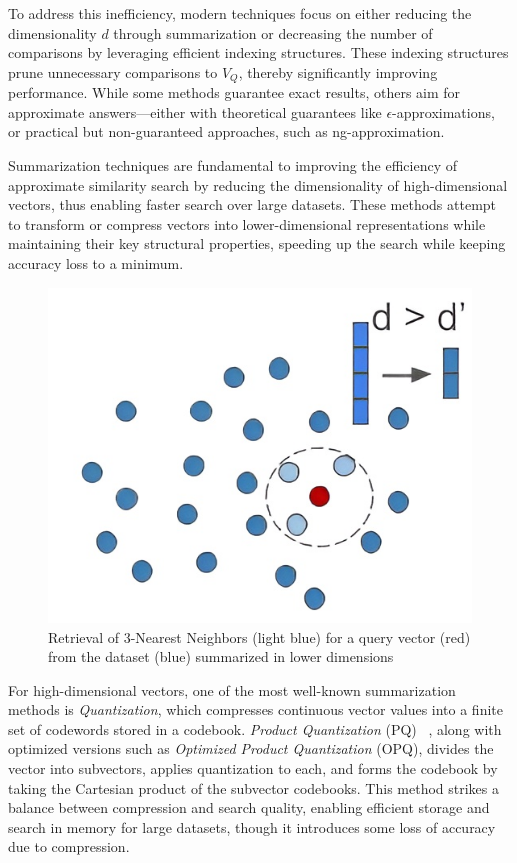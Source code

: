 To address this inefficiency, modern techniques focus on either reducing the dimensionality \(d\) through summarization or decreasing the number of comparisons by leveraging efficient indexing structures. These indexing structures prune unnecessary comparisons to \(V_Q\), thereby significantly improving performance. While some methods guarantee exact results, others aim for approximate answers—either with theoretical guarantees like \(\epsilon\)-approximations, or practical but non-guaranteed approaches, such as ng-approximation.

 Summarization techniques are fundamental to improving the efficiency of approximate similarity search by reducing the dimensionality of high-dimensional vectors, thus enabling faster search over large datasets. These methods attempt to transform or compress vectors into lower-dimensional representations while maintaining their key structural properties, speeding up the search while keeping accuracy loss to a minimum.

\begin{figure}[ht] 
\centering
		\captionsetup{justification=centering}
		\includegraphics[width=0.5\columnwidth]{../img/related/sumb.jpg}
		\caption{Retrieval of 3-Nearest Neighbors (light blue) for a query vector (red) from the dataset (blue) summarized in lower dimensions}        
		\label{fig:sum_retrieval}
\end{figure}

For high-dimensional vectors, one of the most well-known summarization methods is \textit{Quantization}, which compresses continuous vector values into a finite set of codewords stored in a codebook. \textit{Product Quantization} (PQ)~\cite{jegou11} , along with optimized versions such as \textit{Optimized Product Quantization} (OPQ), divides the vector into subvectors, applies quantization to each, and forms the codebook by taking the Cartesian product of the subvector codebooks. This method strikes a balance between compression and search quality, enabling efficient storage and search in memory for large datasets, though it introduces some loss of accuracy due to compression.

